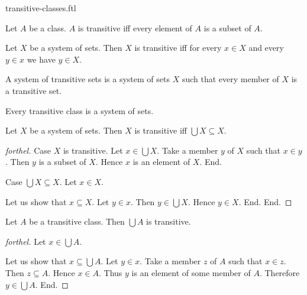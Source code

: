 \documentclass{naproche-library}
\begin{document}
\begin{smodule}[title=Transitive Classes]{transitive-classes.ftl}

\begin{definition}[forthel,id=SET_THEORY_01_8167915266244608]
  Let $A$ be a class.
  $A$ is transitive iff every element of $A$ is a subset of $A$.
\end{definition}

\begin{proposition}[forthel,id=SET_THEORY_01_6964770955591680]
  Let $X$ be a system of sets.
  Then $X$ is transitive iff for every $x \in X$ and every $y \in x$ we have $y \in X$.
\end{proposition}

\begin{definition}[forthel,id=SET_THEORY_01_4219967964708864]
  A system of transitive sets is a system of sets $X$ such that every member of $X$ is a transitive set.
\end{definition}

\begin{proposition}[forthel,id=SET_THEORY_01_2095807333400576]
  Every transitive class is a system of sets.
\end{proposition}

\begin{proposition}[forthel,id=SET_THEORY_01_6524117649981440]
  Let $X$ be a system of sets.
  Then $X$ is transitive iff $\bigcup X \subseteq X$.
\end{proposition}
\begin{proof}[forthel]
  Case $X$ is transitive.
    Let $x \in \bigcup X$.
    Take a member $y$ of $X$ such that $x \in y$.
    Then $y$ is a subset of $X$.
    Hence $x$ is an element of $X$.
  End.

  Case $\bigcup X \subseteq X$.
    Let $x \in X$.

    Let us show that $x \subseteq X$.
      Let $y \in x$.
      Then $y \in \bigcup X$.
      Hence $y \in X$.
    End.
  End.
\end{proof}

\begin{proposition}[forthel,id=SET_THEORY_01_620651482185728]
  Let $A$ be a transitive class.
  Then $\bigcup A$ is transitive.
\end{proposition}
\begin{proof}[forthel]
  Let $x \in \bigcup A$.

  Let us show that $x \subseteq \bigcup A$.
    Let $y \in x$.
    Take a member $z$ of $A$ such that $x \in z$.
    Then $z \subseteq A$.
    Hence $x \in A$.
    Thus $y$ is an element of some member of $A$.
    Therefore $y \in \bigcup A$.
  End.
\end{proof}


\end{smodule}
\end{document}
